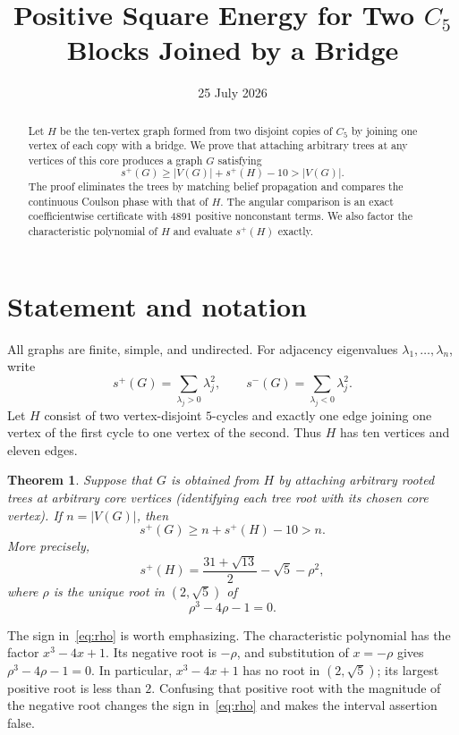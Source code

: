 \documentclass[11pt]{article}
\title{Positive Square Energy for Two $C_5$ Blocks Joined by a Bridge}
\author{}
\date{25 July 2026}
\newtheorem{theorem}{Theorem}[section]
\theoremstyle{remark}
\begin{document}
\maketitle

\begin{abstract}
Let $H$ be the ten-vertex graph formed from two disjoint copies of $C_5$ by
joining one vertex of each copy with a bridge.  We prove that attaching
arbitrary trees at any vertices of this core produces a graph $G$ satisfying
\[
 s^+(G)\geq |V(G)|+s^+(H)-10>|V(G)|.
\]
The proof eliminates the trees by matching belief propagation and compares
the continuous Coulson phase with that of $H$.  The angular comparison is an
exact coefficientwise certificate with $4891$ positive nonconstant terms.
We also factor the characteristic polynomial of $H$ and evaluate $s^+(H)$
exactly.
\end{abstract}

\section{Statement and notation}

All graphs are finite, simple, and undirected.  For adjacency eigenvalues
$\lambda_1,\ldots,\lambda_n$, write
\[
 s^+(G)=\sum_{\lambda_j>0}\lambda_j^2,
 \qquad
 s^-(G)=\sum_{\lambda_j<0}\lambda_j^2.
\]
Let $H$ consist of two vertex-disjoint $5$-cycles and exactly one edge joining
one vertex of the first cycle to one vertex of the second.  Thus $H$ has ten
vertices and eleven edges.

\begin{theorem}\label{thm:main}
Suppose that $G$ is obtained from $H$ by attaching arbitrary rooted trees at
arbitrary core vertices (identifying each tree root with its chosen core
vertex).  If $n=|V(G)|$, then
\begin{equation}\label{eq:main}
 s^+(G)\geq n+s^+(H)-10>n.
\end{equation}
More precisely,
\begin{equation}\label{eq:bare-energy}
 s^+(H)=\frac{31+\sqrt{13}}2-\sqrt5-\rho^2,
\end{equation}
where $\rho$ is the unique root in $(2,\sqrt5)$ of
\begin{equation}\label{eq:rho}
 \rho^3-4\rho-1=0.
\end{equation}
\end{theorem}

The sign in~\eqref{eq:rho} is worth emphasizing.  The characteristic
polynomial has the factor $x^3-4x+1$.  Its negative root is $-\rho$, and
substitution of $x=-\rho$ gives $\rho^3-4\rho-1=0$.  In particular,
$x^3-4x+1$ has no root in $(2,\sqrt5)$; its largest positive root is less
than $2$.  Confusing that positive root with the magnitude of the negative
root changes the sign in~\eqref{eq:rho} and makes the interval assertion
false.
\end{document}
